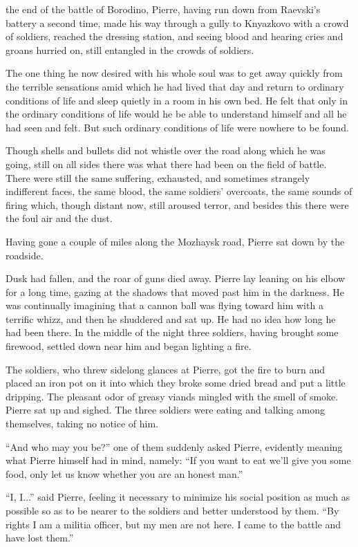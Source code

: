  the end of the battle of Borodino, Pierre, having run down
from Raevski's battery a second time, made his way through a
gully to Knyazkovo with a crowd of soldiers, reached the dressing
station, and seeing blood and hearing cries and groans hurried
on, still entangled in the crowds of soldiers.

The one thing he now desired with his whole soul was to get away
quickly from the terrible sensations amid which he had lived that
day and return to ordinary conditions of life and sleep quietly
in a room in his own bed. He felt that only in the ordinary
conditions of life would he be able to understand himself and all
he had seen and felt. But such ordinary conditions of life were
nowhere to be found.

Though shells and bullets did not whistle over the road along
which he was going, still on all sides there was what there had
been on the field of battle. There were still the same suffering,
exhausted, and sometimes strangely indifferent faces, the same
blood, the same soldiers' overcoats, the same sounds of firing
which, though distant now, still aroused terror, and besides this
there were the foul air and the dust.

Having gone a couple of miles along the Mozhaysk road, Pierre sat
down by the roadside.

Dusk had fallen, and the roar of guns died away. Pierre lay
leaning on his elbow for a long time, gazing at the shadows that
moved past him in the darkness. He was continually imagining that
a cannon ball was flying toward him with a terrific whizz, and
then he shuddered and sat up. He had no idea how long he had been
there. In the middle of the night three soldiers, having brought
some firewood, settled down near him and began lighting a fire.

The soldiers, who threw sidelong glances at Pierre, got the fire
to burn and placed an iron pot on it into which they broke some
dried bread and put a little dripping. The pleasant odor of
greasy viands mingled with the smell of smoke. Pierre sat up and
sighed. The three soldiers were eating and talking among
themselves, taking no notice of him.

``And who may you be?'' one of them suddenly asked Pierre,
evidently meaning what Pierre himself had in mind, namely: ``If
you want to eat we'll give you some food, only let us know
whether you are an honest man.''

``I, I...'' said Pierre, feeling it necessary to minimize his
social position as much as possible so as to be nearer to the
soldiers and better understood by them. ``By rights I am a
militia officer, but my men are not here. I came to the battle
and have lost them.''

